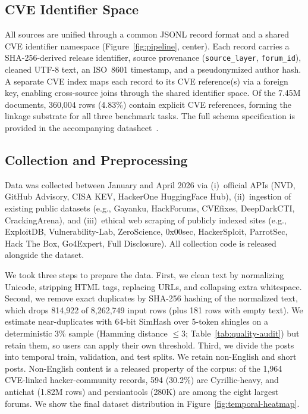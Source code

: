 \documentclass{article}
\begin{document}
\subsection{CVE Identifier Space}

All sources are unified through a common JSONL record format and a shared CVE identifier namespace (Figure~\ref{fig:pipeline}, center). Each record carries a SHA-256-derived release identifier, source provenance (\texttt{source\_layer}, \texttt{forum\_id}), cleaned UTF-8 text, an ISO~8601 timestamp, and a pseudonymized author hash. A separate CVE index maps each record to its CVE reference(s) via a foreign key, enabling cross-source joins through the shared identifier space. Of the 7.45M documents, 360,004 rows (4.83\%) contain explicit CVE references, forming the linkage substrate for all three benchmark tasks. The full schema specification is provided in the accompanying datasheet~\citep{gebru2021datasheet}.

\subsection{Collection and Preprocessing}

Data was collected between January and April 2026 via (i)~official APIs (NVD, GitHub Advisory, CISA KEV, HackerOne HuggingFace Hub), (ii)~ingestion of existing public datasets (e.g., Gayanku, HackForums, CVEfixes, DeepDarkCTI, CrackingArena), and (iii)~ethical web scraping of publicly indexed sites (e.g., ExploitDB, Vulnerability-Lab, ZeroScience, 0x00sec, HackerSploit, ParrotSec, Hack The Box, Go4Expert, Full Disclosure). All collection code is released alongside the dataset.

We took three steps to prepare the data. First, we clean text by normalizing Unicode, stripping HTML tags, replacing URLs, and collapsing extra whitespace. Second, we remove exact duplicates by SHA-256 hashing of the normalized text, which drops 814,922 of 8,262,749 input rows (plus 181 rows with empty text). We estimate near-duplicates with 64-bit SimHash over 5-token shingles on a deterministic 3\% sample (Hamming distance $\leq$3; Table~\ref{tab:quality-audit}) but retain them, so users can apply their own threshold. Third, we divide the posts into temporal train, validation, and test splits. We retain non-English and short posts. Non-English content is a released property of the corpus: of the 1,964 CVE-linked hacker-community records, 594 (30.2\%) are Cyrillic-heavy, and antichat (1.82M rows) and persiantools (280K) are among the eight largest forums. We show the final dataset distribution in Figure~\ref{fig:temporal-heatmap}.
\end{document}
